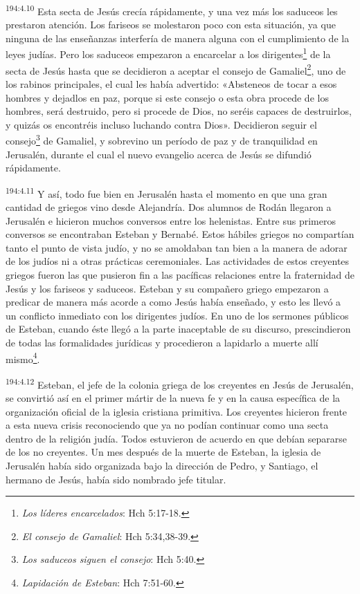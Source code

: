 \par
\textsuperscript{194:4.10} Esta secta de Jesús crecía rápidamente, y una vez más los saduceos les prestaron atención. Los fariseos se molestaron poco con esta situación, ya que ninguna de las enseñanzas interfería de manera alguna con el cumplimiento de la leyes judías. Pero los saduceos empezaron a encarcelar a los dirigentes\footnote{\textit{Los líderes encarcelados}: Hch 5:17-18.} de la secta de Jesús hasta que se decidieron a aceptar el consejo de Gamaliel\footnote{\textit{El consejo de Gamaliel}: Hch 5:34,38-39.}, uno de los rabinos principales, el cual les había advertido: «Absteneos de tocar a esos hombres y dejadlos en paz, porque si este consejo o esta obra procede de los hombres, será destruido, pero si procede de Dios, no seréis capaces de destruirlos, y quizás os encontréis incluso luchando contra Dios». Decidieron seguir el consejo\footnote{\textit{Los saduceos siguen el consejo}: Hch 5:40.} de Gamaliel, y sobrevino un período de paz y de tranquilidad en Jerusalén, durante el cual el nuevo evangelio acerca de Jesús se difundió rápidamente.

\par
\textsuperscript{194:4.11} Y así, todo fue bien en Jerusalén hasta el momento en que una gran cantidad de griegos vino desde Alejandría. Dos alumnos de Rodán llegaron a Jerusalén e hicieron muchos conversos entre los helenistas. Entre sus primeros conversos se encontraban Esteban y Bernabé. Estos hábiles griegos no compartían tanto el punto de vista judío, y no se amoldaban tan bien a la manera de adorar de los judíos ni a otras prácticas ceremoniales. Las actividades de estos creyentes griegos fueron las que pusieron fin a las pacíficas relaciones entre la fraternidad de Jesús y los fariseos y saduceos. Esteban y su compañero griego empezaron a predicar de manera más acorde a como Jesús había enseñado, y esto les llevó a un conflicto inmediato con los dirigentes judíos. En uno de los sermones públicos de Esteban, cuando éste llegó a la parte inaceptable de su discurso, prescindieron de todas las formalidades jurídicas y procedieron a lapidarlo a muerte allí mismo\footnote{\textit{Lapidación de Esteban}: Hch 7:51-60.}.

\par
\textsuperscript{194:4.12} Esteban, el jefe de la colonia griega de los creyentes en Jesús de Jerusalén, se convirtió así en el primer mártir de la nueva fe y en la causa específica de la organización oficial de la iglesia cristiana primitiva. Los creyentes hicieron frente a esta nueva crisis reconociendo que ya no podían continuar como una secta dentro de la religión judía. Todos estuvieron de acuerdo en que debían separarse de los no creyentes. Un mes después de la muerte de Esteban, la iglesia de Jerusalén había sido organizada bajo la dirección de Pedro, y Santiago, el hermano de Jesús, había sido nombrado jefe titular.

